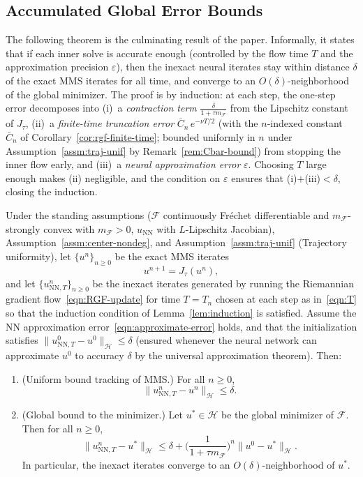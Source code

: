 \documentclass[twoside,11pt]{article}
\newcommand{\rev}[1]{#1}                           %
\newcommand{\NN}{\mathrm{NN}}
\newcommand{\calF}{\mathcal{F}}
\newcommand{\calH}{\mathcal{H}}
\begin{document}
\subsection{Accumulated Global Error Bounds}
\rev{%
The following theorem is the culminating result of the paper.
Informally, it states that if each inner solve is accurate enough
(controlled by the flow time $T$ and the approximation precision $\varepsilon$),
then the inexact neural iterates stay within distance $\delta$ of the exact MMS iterates
for all time, and converge to an $O(\delta)$-neighborhood of the global minimizer.
The proof is by induction: at each step, the one-step error decomposes into
(i)~a \emph{contraction term} $\frac{\delta}{1+\tau m_\calF}$ from the Lipschitz constant of $J_\tau$,
(ii)~a \emph{finite-time truncation error} $\bar C_n\,e^{-\nu T/2}$ (with the $n$-indexed constant $\bar C_n$ of Corollary~\ref{cor:rgf-finite-time}; bounded uniformly in $n$ under Assumption~\ref{assm:traj-unif} by Remark~\ref{rem:Cbar-bound}) from stopping the inner flow early, and
(iii)~a \emph{neural approximation error} $\varepsilon$.
Choosing $T$ large enough makes (ii) negligible, and the condition on $\varepsilon$
ensures that (i)$+$(iii)$<\delta$, closing the induction.
}
\begin{theorem}\label{thm:global_error}
Under the standing assumptions ($\calF$ continuously Fr\'echet differentiable and $m_\calF$-strongly convex with $m_\calF>0$, $u_\NN$ with $L$-Lipschitz Jacobian), Assumption~\ref{assm:center-nondeg}, and Assumption~\ref{assm:traj-unif} (Trajectory uniformity), let $\{u^n\}_{n\ge0}$ be the exact MMS iterates
\[
u^{n+1}=J_\tau(u^n),
\]
and let $\{u_{\mathrm{NN},T}^n\}_{n\ge0}$ be the inexact iterates generated by running the Riemannian gradient flow~\eqref{eqn:RGF-update} for time $T=T_n$ chosen at each step as in~\eqref{eqn:T} so that the induction condition of Lemma~\ref{lem:induction} is satisfied. Assume the NN approximation error~\eqref{eqn:approximate-error} holds, and that the initialization satisfies $\|u^0_{\NN,T}-u^0\|_\calH\le\delta$ (ensured whenever the neural network can approximate $u^0$ to accuracy $\delta$ by the universal approximation theorem). Then:
\begin{enumerate}
\item[(a).] (Uniform bound tracking of MMS.)
For all $n\ge0$,
\[
\|u_{\mathrm{NN},T}^n-u^n\|_\mathcal{H} \le \delta .
\]

\item[(b).] (Global bound to the minimizer.)
Let $u^* \in \mathcal{H}$ be the global minimizer of $\calF$. Then for all $n\ge0$,
\[
\|u_{\mathrm{NN},T}^n-u^*\|_\calH
\le \delta + \Big(\frac{1}{1+\tau m_\calF}\Big)^n \|u^0-u^*\|_\calH.
\]
In particular, the inexact iterates converge to an $O(\delta)$-neighborhood of $u^*$.
\end{enumerate}
\end{theorem}
\end{document}
